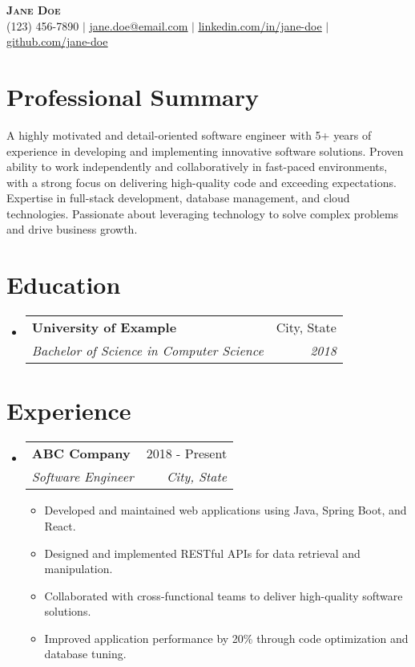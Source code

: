 \documentclass[letterpaper,11pt]{article}
\makeatletter
\newcommand{\resumeItem}[1]{
\item\small{
{#1 \vspace{-2pt}}
}
}
\newcommand{\resumeSubheading}[4]{
\vspace{-2pt}\item
\begin{tabular*}{0.97\textwidth}[t]{l@{\extracolsep{\fill}}r}
\textbf{#1} & #2 \\
\textit{\small#3} & \textit{\small #4} \\
\end{tabular*}\vspace{-7pt}
}
\newcommand{\resumeSubHeadingListStart}{\begin{itemize}[leftmargin=0.15in, label={}]}
\newcommand{\resumeSubHeadingListEnd}{\end{itemize}}
\newcommand{\resumeItemListStart}{\begin{itemize}}
\newcommand{\resumeItemListEnd}{\end{itemize}\vspace{-5pt}}
\makeatother
\begin{document}
\begin{center}
\textbf{\Huge \scshape Jane Doe} \\ \vspace{1pt}
\small (123) 456-7890 $|$ \href{mailto:jane.doe@email.com}{\underline{jane.doe@email.com}} $|$
\href{https://www.linkedin.com/in/jane-doe/}{\underline{linkedin.com/in/jane-doe}} $|$
\href{https://github.com/jane-doe}{\underline{github.com/jane-doe}}
\end{center}


\section{Professional Summary} %
A highly motivated and detail-oriented software engineer with 5+ years of experience in developing and implementing innovative software solutions. Proven ability to work independently and collaboratively in fast-paced environments, with a strong focus on delivering high-quality code and exceeding expectations. Expertise in full-stack development, database management, and cloud technologies. Passionate about leveraging technology to solve complex problems and drive business growth.

\section{Education}
\resumeSubHeadingListStart
\resumeSubheading{University of Example}{City, State}{Bachelor of Science in Computer Science}{2018}
\resumeSubHeadingListEnd

\section{Experience}
\resumeSubHeadingListStart
\resumeSubheading{ABC Company}{2018 - Present}{Software Engineer}{City, State}
\resumeItemListStart
\resumeItem{Developed and maintained web applications using Java, Spring Boot, and React.}
\resumeItem{Designed and implemented RESTful APIs for data retrieval and manipulation.}
\resumeItem{Collaborated with cross-functional teams to deliver high-quality software solutions.}
\resumeItem{Improved application performance by 20\% through code optimization and database tuning.}
\resumeItemListEnd
\resumeSubHeadingListEnd
\end{document}
